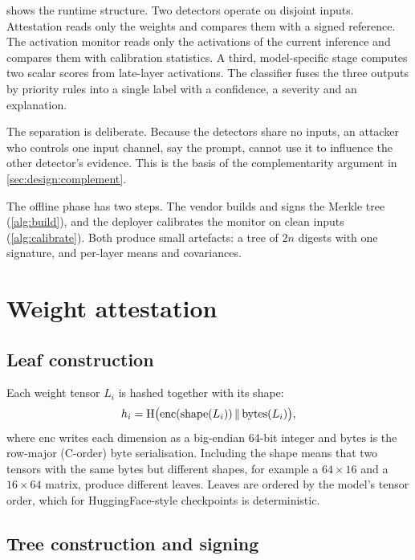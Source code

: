  shows the runtime structure. Two detectors operate on disjoint inputs.
Attestation reads only the weights and compares them with a signed reference. The activation
monitor reads only the activations of the current inference and compares them with calibration
statistics. A third, model-specific stage computes two scalar scores from late-layer
activations. The classifier fuses the three outputs by priority rules into a single label with a
confidence, a severity and an explanation.

The separation is deliberate. Because the detectors share no inputs, an attacker who controls
one input channel, say the prompt, cannot use it to influence the other detector's evidence.
This is the basis of the complementarity argument in \cref{sec:design:complement}.

The offline phase has two steps. The vendor builds and signs the Merkle tree
(\cref{alg:build}), and the deployer calibrates the monitor on clean inputs
(\cref{alg:calibrate}). Both produce small artefacts: a tree of $2n$ digests with one
signature, and per-layer means and covariances.

\section{Weight attestation}
\label{sec:design:merkle}

\subsection{Leaf construction}

Each weight tensor $L_i$ is hashed together with its shape:
\begin{equation}
  h_i = \mathrm{H}\big(\mathrm{enc}(\mathrm{shape}(L_i)) \,\|\, \mathrm{bytes}(L_i)\big),
  \label{eq:leaf}
\end{equation}
where $\mathrm{enc}$ writes each dimension as a big-endian 64-bit integer and
$\mathrm{bytes}$ is the row-major (C-order) byte serialisation. Including the shape means that
two tensors with the same bytes but different shapes, for example a $64\times16$ and a
$16\times64$ matrix, produce different leaves. Leaves are ordered by the model's tensor order,
which for HuggingFace-style checkpoints is deterministic.

\subsection{Tree construction and signing}


